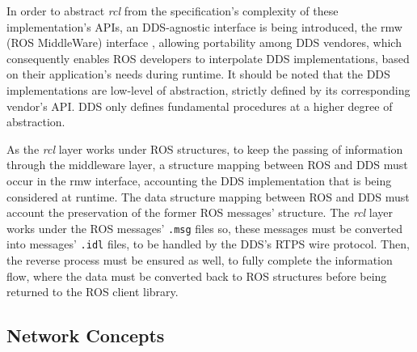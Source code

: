 In order to abstract \textit{rcl} from the specification's complexity of these implementation's APIs, an DDS-agnostic interface is being introduced, the rmw (ROS MiddleWare) interface \cite{casini2019response}, allowing portability among DDS vendores, which consequently enables ROS developers to interpolate DDS implementations, based on their application's needs during runtime. It should be noted that the DDS implementations are low-level of abstraction, strictly defined by its corresponding vendor's API. DDS only defines fundamental procedures at a higher degree of abstraction.  


As the \textit{rcl} layer works under ROS structures, to keep the passing of information through the middleware layer, a structure mapping between ROS and DDS must occur in the rmw interface, accounting the DDS implementation that is being considered at runtime. \cite{casini2019response} The data structure mapping between ROS and DDS must account the preservation of the former ROS messages' structure. The \textit{rcl} layer works under the ROS messages' \texttt{.msg} files so, these messages must be converted into messages' \texttt{.idl} files, to be handled by the DDS's RTPS wire protocol. \cite{ros-on-dds} Then, the reverse process must be ensured as well, to fully complete the information flow, where the data must be converted back to ROS structures before being returned to the ROS client library.


\subsection{Network Concepts}

